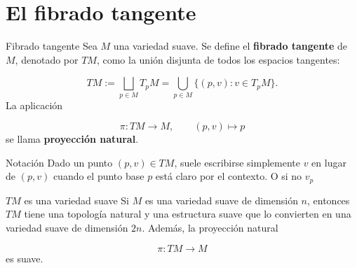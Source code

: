 \section{El fibrado tangente}
\begin{bookdefinition}{Fibrado tangente}
Sea $M$ una variedad suave. Se define el \textbf{fibrado tangente} de $M$, denotado por $TM$, como la unión disjunta de todos los espacios tangentes:

\[
TM:=\bigsqcup_{p\in M}T_pM
=
\bigcup_{p\in M}\{(p,v):v\in T_pM\}.
\]
La aplicación

\[
\pi:TM\to M,\qquad (p,v)\mapsto p
\]
se llama \textbf{proyección natural}.

\end{bookdefinition}
\label{blk:4762ec}
\begin{bookremark}{Notación}
Dado un punto $(p,v)\in TM$, suele escribirse simplemente $v$ en lugar de $(p,v)$ cuando el punto base $p$ está claro por el contexto. O si no $v_{p}$

\end{bookremark}
\begin{booktheorem}{$TM$ es una variedad suave}
Si $M$ es una variedad suave de dimensión $n$, entonces $TM$ tiene una topología natural y una estructura suave que lo convierten en una variedad suave de dimensión $2n$. Además, la proyección natural

\[
\pi:TM\to M
\]
es suave.

\end{booktheorem}
